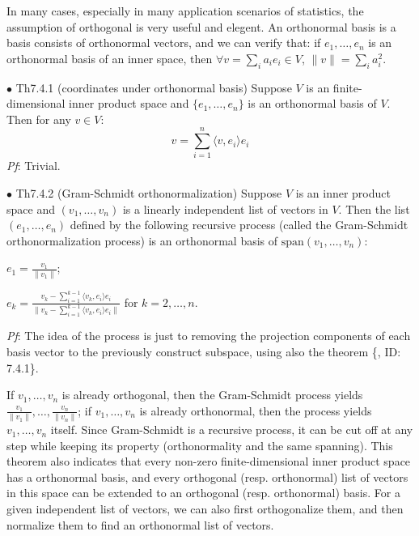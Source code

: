 \documentclass{article}
\begin{document}
\begin{Rmk}{}
    In many cases, especially in many application scenarios of statistics, the assumption of orthogonal is very useful and elegent. \textcolor{Df}{An orthonormal basis is a basis consists of orthonormal vectors}, and we can verify that: \textcolor{Th}{if $e_1, \dots, e_n$ is an orthonormal basis of an inner space, then $\forall v = \sum_{i} a_i e_i\in V$, $\|v\| = \sum_{i}a_i^2$.} 
\end{Rmk}

\begin{Th}{$\bullet$ Th7.4.1 (coordinates under orthonormal basis)}
    Suppose $V$ is an finite-dimensional inner product space and $\{e_1, \dots, e_n\}$ is an orthonormal basis of $V$. Then for any $v\in V$:
    $$v = \sum_{i=1}^{n}\langle v,e_i\rangle e_i$$
    \tcblower
    \textit{Pf}: Trivial.
\end{Th}

\begin{Th}{$\bullet$ Th7.4.2 (Gram-Schmidt orthonormalization)}
    Suppose $V$ is an inner product space and $(v_1, \dots, v_n)$ is a linearly independent list of vectors in $V$. Then the list $(e_1, \dots, e_n)$ defined by the following recursive process (called the Gram-Schmidt orthonormalization process) is an orthonormal basis of $\text{span}(v_1, \dots, v_n)$:
    \begin{compactenum}
        \item $e_1 = \frac{v_1}{\|v_1\|}$;
        \item $e_k = \frac{v_k - \sum_{i=1}^{k-1}\langle v_k, e_i\rangle e_i}{\|v_k - \sum_{i=1}^{k-1}\langle v_k, e_i\rangle e_i\|}$ for $k=2, \dots, n$.
    \end{compactenum}
    \tcblower
    \textit{Pf}: The idea of the process is just to removing the projection components of each basis vector to the previously construct subspace, using also the theorem \{, ID: 7.4.1\}.
\end{Th}

\begin{Rmk}{}
    \textcolor{Th}{If $v_1, \dots, v_n$ is already orthogonal, then the Gram-Schmidt process yields $\frac{v_1}{\|v_1\|}, \dots, \frac{v_n}{\|v_n\|}$; if $v_1, \dots, v_n$ is already orthonormal, then the process yields $v_1, \dots, v_n$ itself.} Since Gram-Schmidt is a recursive process, it can be cut off at any step while keeping its property (orthonormality and the same spanning).
    This theorem also indicates that \textcolor{Th}{every non-zero finite-dimensional inner product space has a orthonormal basis, and every orthogonal (resp. orthonormal) list of vectors in this space can be extended to an orthogonal (resp. orthonormal) basis.} For a given independent list of vectors, we can also first orthogonalize them, and then normalize them to find an orthonormal list of vectors.
\end{Rmk}
\end{document}
